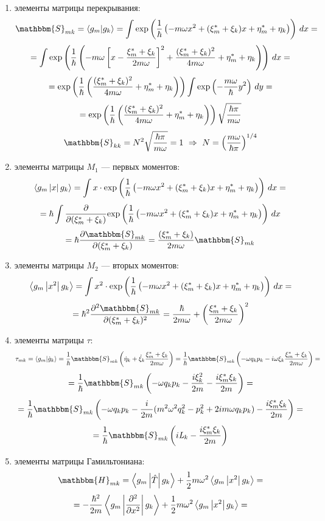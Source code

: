 \begin{enumerate}
\item элементы матрицы перекрывания:
$$\mathbbm{S}_{mk}=\myint{g_m}{g_k}=\int\myexp{\frac{1}{\hbar}\left(-m\omega x^2+(\xi_m^*+\xi_k)x+\eta_m^*+\eta_k\right)}\,dx=$$
$$=\int\myexp{\frac{1}{\hbar}\left(-m\omega\left[x-\frac{\xi_m^*+\xi_k}{2m\omega}\right]^2+\frac{(\xi_m^*+\xi_k)^2}{4m\omega}+%
				   \eta_m^*+\eta_k\right)}\,dx=$$
$$=\text{exp}\left( \frac{1}{\hbar}\left(\frac{(\xi_m^*+\xi_k)^2}{4m\omega}+\eta_m^*+\eta_k\right) \right)\int\text{exp}\left( -\frac{m\omega}{\hbar}y^2 \right)\,dy=$$
$$=\text{exp}\left( \frac{1}{\hbar}\left(\frac{(\xi_m^*+\xi_k)^2}{4m\omega}+\eta_m^*+\eta_k\right) \right)\sqrt{\frac{\hbar\pi}{m\omega}}$$
$$\mathbbm{S}_{kk}= N^2 \sqrt{ \frac{\hbar\pi}{m\omega} }=1\ \Rightarrow\ N = \left(\frac{m\omega}{\hbar\pi}\right)^{1/4}$$
\item элементы матрицы $M_1$ --- первых моментов:
$$\left\langle g_m \left| x \right| g_k \right\rangle = \int x\cdot\text{exp}\left( \frac{1}{\hbar}\left(-m\omega x^2+(\xi_m^*+\xi_k)x+\eta_m^*+\eta_k\right) \right)\,dx=$$
$$=\hbar\int\frac{\partial}{\partial(\xi_m^*+\xi_k)}\text{exp}\left( \frac{1}{\hbar}\left(-m\omega x^2 + (\xi_m^*+\xi_k)x+\eta_m^*+\eta_k\right) \right)\,dx$$
$$=\hbar\frac{\partial\mathbbm{S}_{mk}}{\partial(\xi_m^*+\xi_k)}=\frac{(\xi_m^*+\xi_k)}{2m\omega}\mathbbm{S}_{mk}$$
\item элементы матрицы $M_2$ --- вторых моментов:
$$\left\langle g_m \left| x^2 \right| g_k \right\rangle=\int x^2\cdot\text{exp}\left( \frac{1}{\hbar}\left(-m\omega x^2+(\xi_m^*+\xi_k)x+\eta_m^*+\eta_k\right) \right)\,dx=$$
$$=\hbar^2\frac{\partial^2\mathbbm{S}_{mk}}{\partial(\xi_m^*+\xi_k)^2}=\frac{\hbar}{2m\omega}+\left(\frac{\xi_m^*+\xi_k}{2m\omega}\right)^2$$
\item элементы матрицы $\tau$:
$$\tau_{mk}=\myint{g_m}{\dot{g}_k}=%
				   \frac{1}{\hbar}\mathbbm{S}_{mk}\left(\dot{\eta}_k+\dot{\xi}_k\frac{\xi_m^*+\xi_k}{2m\omega}\right)=%
				   \frac{1}{\hbar}\mathbbm{S}_{mk}\left(-\omega q_kp_k-i\omega\xi_k\frac{\xi_m^*+\xi_k}{2m\omega}\right)=$$
$$=\frac{1}{\hbar}\mathbbm{S}_{mk}\left(-\omega q_kp_k-\frac{i\xi_k^2}{2m}-\frac{i\xi_m^*\xi_k}{2m}\right)=$$
$$=\frac{1}{\hbar}\mathbbm{S}_{mk}\left(-\omega q_kp_k-\frac{i}{2m}(m^2\omega^2q_k^2-p_k^2+2im\omega q_kp_k)-%
					 \frac{i\xi_m^*\xi_k}{2m}\right)=$$
$$=\frac{1}{\hbar}\mathbbm{S}_{mk}\left(i\myl_k-\frac{i\xi_m^*\xi_k}{2m}\right)$$
\item элементы матрицы Гамильтониана:
$$\mathbbm{H}_{mk} = \mymean{g_m}{\hat{T}}{g_k} + \frac{1}{2}m\omega^2\mymean{g_m}{x^2}{g_k} =$$
$$=-\frac{\hbar^2}{2m}\left\langle g_m \left| \frac{\partial^2}{\partial x^2} \right| g_k \right\rangle + \frac{1}{2}m\omega^2\left\langle g_m \left| x^2 \right| g_k \right\rangle=$$

\end{enumerate}
